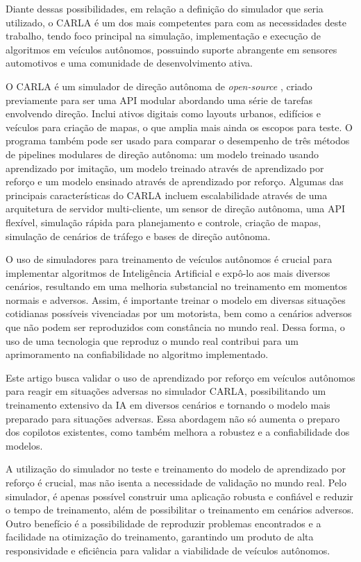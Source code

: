 \documentclass[a4paper,12pt,Times]{article}
\begin{document}
Diante dessas possibilidades, em relação a definição do simulador que seria utilizado, o CARLA é um dos mais competentes para com as necessidades deste trabalho, tendo foco principal na simulação, implementação e execução de algoritmos em veículos autônomos, possuindo suporte abrangente em sensores automotivos e uma comunidade de desenvolvimento ativa.

O CARLA é um simulador de direção autônoma de \textit{open-source} \cite{Dosovitskiy17}, criado previamente para ser uma API modular abordando uma série de tarefas envolvendo direção. Inclui ativos digitais como layouts urbanos, edifícios e veículos para criação de mapas, o que amplia mais ainda os escopos para teste. O programa também pode ser usado para comparar o desempenho de três métodos de pipelines modulares de direção autônoma: um modelo treinado usando aprendizado por imitação, um modelo treinado através de aprendizado por reforço e um modelo ensinado através de aprendizado por reforço. Algumas das principais características do CARLA incluem escalabilidade através de uma arquitetura de servidor multi-cliente, um sensor de direção autônoma, uma API flexível, simulação rápida para planejamento e controle, criação de mapas, simulação de cenários de tráfego e bases de direção autônoma.


O uso de simuladores para treinamento de veículos autônomos é crucial para implementar algoritmos de Inteligência Artificial e expô-lo aos mais diversos cenários, resultando em uma melhoria substancial no treinamento em momentos normais e adversos. Assim, é importante treinar o modelo em diversas situações cotidianas possíveis vivenciadas por um motorista, bem como a cenários adversos que não podem ser reproduzidos com constância no mundo real. Dessa forma, o uso de uma tecnologia que reproduz o mundo real contribui para um aprimoramento na confiabilidade no algoritmo implementado.

Este artigo busca validar o uso de aprendizado por reforço em veículos autônomos para reagir em situações adversas no simulador CARLA, possibilitando um treinamento extensivo da IA em diversos cenários e tornando o modelo mais preparado para situações adversas. Essa abordagem não só aumenta o preparo dos copilotos existentes, como também melhora a robustez e a confiabilidade dos modelos.

A utilização do simulador no teste e treinamento do modelo de aprendizado por reforço é crucial, mas não isenta a necessidade de validação no mundo real. Pelo simulador, é apenas possível construir uma aplicação robusta e confiável e reduzir o tempo de treinamento, além de possibilitar o treinamento em cenários adversos. Outro benefício é a possibilidade de reproduzir problemas encontrados e a facilidade na otimização do treinamento, garantindo um produto de alta responsividade e eficiência para validar a viabilidade de veículos autônomos.
\end{document}
